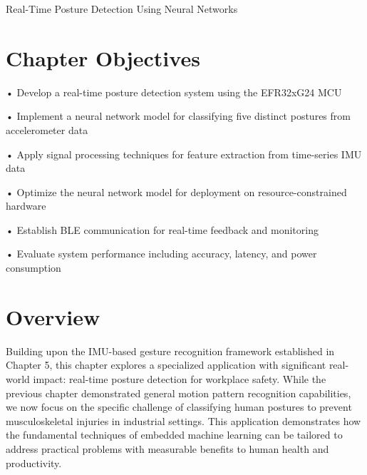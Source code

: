 \documentclass[
  9pt,
  letterpaper,
  abstract,
  titlepage]{scrbook}
\makeatletter
\renewcommand\chapter{\clearpage\global\@topnum\z@
\@afterindentfalse \secdef\@chapter\@schapter}
\newif\if@firstnumbered%
\newif\if@firstunnumbered%
\newcounter{lastRomanPage}
\let\old@chapter\chapter%
\renewcommand{\chapter}{%
  \@ifstar{\unnumbered@chapter}{\numbered@chapter}%
}
\newcommand{\numbered@chapter}[1]{%
  \if@firstnumbered%
    \cleardoublepage%
    \setcounter{lastRomanPage}{\value{page}}%
    \pagenumbering{arabic}%
    \@firstnumberedfalse%
  \else
    \setcounter{page}{\value{page}}%
  \fi
  \old@chapter{#1}%
}
\newcommand{\unnumbered@chapter}[1]{%
  \if@firstunnumbered%
    \clearpage
    \setcounter{lastRomanPage}{\value{page}}%
    \pagenumbering{roman}%
    \@firstunnumberedfalse%
  \fi
  \old@chapter*{#1}%
}
\makeatother
\begin{document}
\chapter{Real-Time Posture Detection Using Neural
Networks}\label{real-time-posture-detection-using-neural-networks}

\section{Chapter Objectives}\label{chapter-objectives-3}

• Develop a real-time posture detection system using the EFR32xG24 MCU

• Implement a neural network model for classifying five distinct
postures from accelerometer data

• Apply signal processing techniques for feature extraction from
time-series IMU data

• Optimize the neural network model for deployment on
resource-constrained hardware

• Establish BLE communication for real-time feedback and monitoring

• Evaluate system performance including accuracy, latency, and power
consumption

\section{Overview}\label{overview-2}

Building upon the IMU-based gesture recognition framework established in
Chapter 5, this chapter explores a specialized application with
significant real-world impact: real-time posture detection for workplace
safety. While the previous chapter demonstrated general motion pattern
recognition capabilities, we now focus on the specific challenge of
classifying human postures to prevent musculoskeletal injuries in
industrial settings. This application demonstrates how the fundamental
techniques of embedded machine learning can be tailored to address
practical problems with measurable benefits to human health and
productivity.
\end{document}
